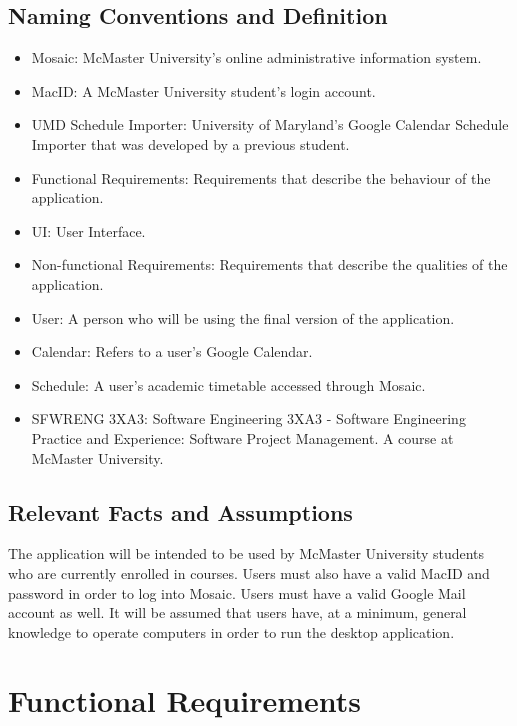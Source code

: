 \documentclass[12pt, titlepage]{article}
\begin{document}
\subsection{Naming Conventions and Definition}
\begin{itemize}
\item Mosaic: McMaster University's online administrative information system.
\item MacID: A McMaster University student's login account.
\item UMD Schedule Importer:  University of Maryland's Google Calendar Schedule Importer that was developed by a previous student.
\item Functional Requirements: Requirements that describe the behaviour of the application.
\item UI: User Interface.
\item Non-functional Requirements: Requirements that describe the qualities of the application.
\item User: A person who will be using the final version of the application. 
\item Calendar: Refers to a user's Google Calendar.
\item Schedule: A user's academic timetable accessed through Mosaic.
\item SFWRENG 3XA3: Software Engineering 3XA3 - Software Engineering Practice and Experience: Software Project Management. A course at McMaster University.

\end{itemize}
\subsection{Relevant Facts and Assumptions}

\hspace{5mm}The application will be intended to be used by McMaster University students who are currently enrolled in courses. Users must also have a valid MacID and password in order to log into Mosaic. Users must have a valid Google Mail account as well. It will be assumed that users have, at a minimum, general knowledge to operate computers in order to run the desktop application. 

\section{Functional Requirements}
\end{document}
